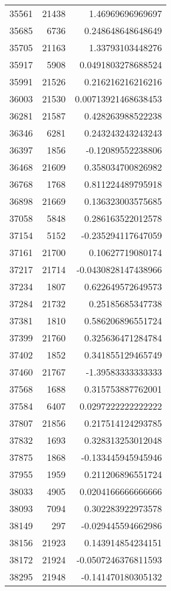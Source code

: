 \begin{tabular}{r | r | r}
35561 & 21438 & 1.46969696969697 \\
35685 & 6736 & 0.248648648648649 \\
35705 & 21163 & 1.33793103448276 \\
35917 & 5908 & 0.0491803278688524 \\
35991 & 21526 & 0.216216216216216 \\
36003 & 21530 & 0.00713921468638453 \\
36281 & 21587 & 0.428263988522238 \\
36346 & 6281 & 0.243243243243243 \\
36397 & 1856 & -0.12089552238806 \\
36468 & 21609 & 0.358034700826982 \\
36768 & 1768 & 0.811224489795918 \\
36898 & 21669 & 0.136323003575685 \\
37058 & 5848 & 0.286163522012578 \\
37154 & 5152 & -0.235294117647059 \\
37161 & 21700 & 0.10627719080174 \\
37217 & 21714 & -0.0430828147438966 \\
37234 & 1807 & 0.622649572649573 \\
37284 & 21732 & 0.25185685347738 \\
37381 & 1810 & 0.586206896551724 \\
37399 & 21760 & 0.325636471284784 \\
37402 & 1852 & 0.341855129465749 \\
37460 & 21767 & -1.39583333333333 \\
37568 & 1688 & 0.315753887762001 \\
37584 & 6407 & 0.0297222222222222 \\
37807 & 21856 & 0.217514124293785 \\
37832 & 1693 & 0.328313253012048 \\
37875 & 1868 & -0.133445945945946 \\
37955 & 1959 & 0.211206896551724 \\
38033 & 4905 & 0.0204166666666666 \\
38093 & 7094 & 0.302283922973578 \\
38149 & 297 & -0.029445594662986 \\
38156 & 21923 & 0.143914854234151 \\
38172 & 21924 & -0.0507246376811593 \\
38295 & 21948 & -0.141470180305132 \\

\end{tabular}
